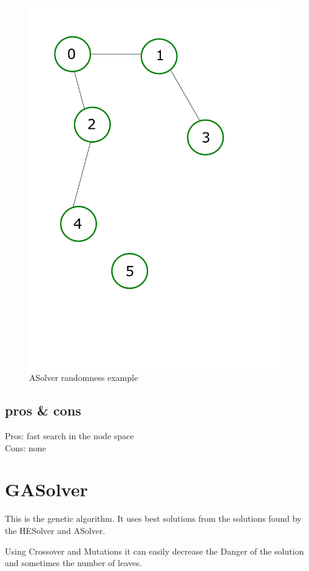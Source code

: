 \documentclass[english]{report}
\begin{document}
	\begin{figure}[H]
		\centering
		\includegraphics[scale=0.5]{nodi.pdf} 
		\caption{ASolver randomness example}
	\end{figure}
\subsection*{pros \& cons}
Pros: fast search in the node space\\
Cons: none
\section{GASolver}
This is the genetic algorithm. It uses best solutions from the solutions found by the HESolver and ASolver. 
\par Using Crossover and Mutations it can easily decrease the Danger of the solution and sometimes the number of leaves.
\end{document}
